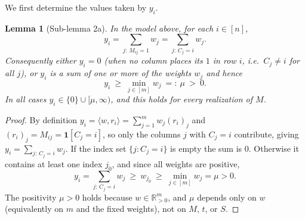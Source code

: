 \documentclass[11pt]{amsart}
\theoremstyle{plain}
\newtheorem{lemma}[theorem]{Lemma}
\theoremstyle{definition}
\def\bR{\mathbb{R}}
\begin{document}
We first determine the values taken by $y_i$.

\begin{lemma}[Sub-lemma 2a]\label{lem:values}
In the model above, for each $i\in[n]$,
\[
y_i=\sum_{j:\,M_{ij}=1} w_j=\sum_{j:\,C_j=i} w_j .
\]
Consequently either $y_i=0$ (when no column places its $1$ in row $i$, i.e.\
$C_j\ne i$ for all $j$), or $y_i$ is a sum of one or more of the weights $w_j$ and
hence
\[
y_i\ \ge\ \min_{j\in[m]} w_j\ =:\ \mu\ >\ 0 .
\]
In all cases $y_i\in\{0\}\cup[\mu,\infty)$, and this holds for every realization of
$M$.
\end{lemma}

\begin{proof}
By definition $y_i=\langle w,r_i\rangle=\sum_{j=1}^m w_j (r_i)_j$ and
$(r_i)_j=M_{ij}=\mathbf 1[C_j=i]$, so only the columns $j$ with $C_j=i$ contribute,
giving $y_i=\sum_{j:\,C_j=i} w_j$. If the index set $\{j:C_j=i\}$ is empty the sum
is $0$. Otherwise it contains at least one index $j_0$, and since all weights are
positive,
\[
y_i=\sum_{j:\,C_j=i} w_j\ \ge\ w_{j_0}\ \ge\ \min_{j\in[m]} w_j=\mu>0 .
\]
The positivity $\mu>0$ holds because $w\in\bR_{>0}^m$, and $\mu$ depends only on
$w$ (equivalently on $m$ and the fixed weights), not on $M$, $t$, or $S$.
\end{proof}
\end{document}
